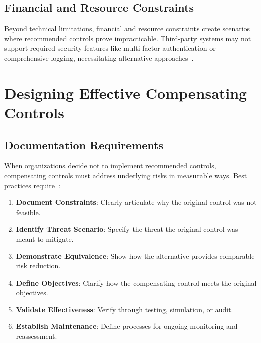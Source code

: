 \documentclass[sigconf,nonacm]{acmart}
\begin{document}
\subsection{Financial and Resource Constraints}

Beyond technical limitations, financial and resource constraints create scenarios where
recommended controls prove impracticable. Third-party systems may not support required
security features like multi-factor authentication or comprehensive logging, necessitating
alternative approaches~\cite{fortinet2024,metricstream2024}.

\section{Designing Effective Compensating Controls}

\subsection{Documentation Requirements}

When organizations decide not to implement recommended controls, compensating controls
must address underlying risks in measurable ways. Best practices
require~\cite{fortinet2024,reach2024}:
\begin{enumerate}
  \item \textbf{Document Constraints}: Clearly articulate why the original control was
        not feasible.
  \item \textbf{Identify Threat Scenario}: Specify the threat the original control was
        meant to mitigate.
  \item \textbf{Demonstrate Equivalence}: Show how the alternative provides comparable
        risk reduction.
  \item \textbf{Define Objectives}: Clarify how the compensating control meets the
        original objectives.
  \item \textbf{Validate Effectiveness}: Verify through testing, simulation, or audit.
  \item \textbf{Establish Maintenance}: Define processes for ongoing monitoring and
        reassessment.
\end{enumerate}
\end{document}
